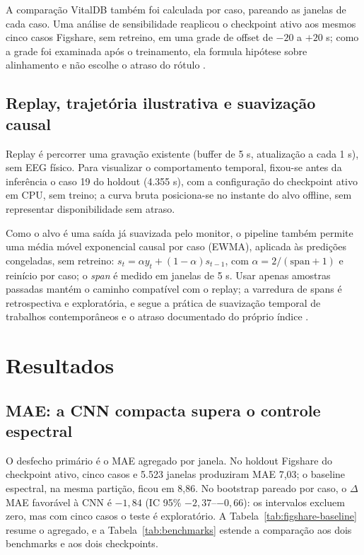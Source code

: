 \documentclass[12pt]{article}
\begin{document}
A comparação VitalDB também foi calculada por caso, pareando as janelas de cada caso. Uma análise de sensibilidade reaplicou o checkpoint ativo aos mesmos cinco casos Figshare, sem retreino, em uma grade de offset de $-20$ a $+20$ s; como a grade foi examinada após o treinamento, ela formula hipótese sobre alinhamento e não escolhe o atraso do rótulo \cite{pilge2006}.

\subsection{Replay, trajetória ilustrativa e suavização causal}

Replay é percorrer uma gravação existente (buffer de 5 s, atualização a cada 1 s), sem EEG físico. Para visualizar o comportamento temporal, fixou-se antes da inferência o caso 19 do holdout (4.355 s), com a configuração do checkpoint ativo em CPU, sem treino; a curva bruta posiciona-se no instante do alvo offline, sem representar disponibilidade sem atraso.

Como o alvo é uma saída já suavizada pelo monitor, o pipeline também permite uma média móvel exponencial causal por caso (EWMA), aplicada às predições congeladas, sem retreino: $s_t = \alpha y_t + (1-\alpha)s_{t-1}$, com $\alpha = 2/(\mathrm{span}+1)$ e reinício por caso; o \textit{span} é medido em janelas de 5 s. Usar apenas amostras passadas mantém o caminho compatível com o replay; a varredura de spans é retrospectiva e exploratória, e segue a prática de suavização temporal de trabalhos contemporâneos \cite{sukriti2026} e o atraso documentado do próprio índice \cite{pilge2006}.

\section{Resultados}
\label{sec:resultados}

\subsection{MAE: a CNN compacta supera o controle espectral}
\label{sec:mae}

O desfecho primário é o MAE agregado por janela. No holdout Figshare do checkpoint ativo, cinco casos e 5.523 janelas produziram MAE 7,03; o baseline espectral, na mesma partição, ficou em 8,86. No bootstrap pareado por caso, o $\Delta$MAE favorável à CNN é $-1{,}84$ (IC 95\% $-2{,}37$--$-0{,}66$): os intervalos excluem zero, mas com cinco casos o teste é exploratório. A Tabela~\ref{tab:figshare-baseline} resume o agregado, e a Tabela~\ref{tab:benchmarks} estende a comparação aos dois benchmarks e aos dois checkpoints.
\end{document}
